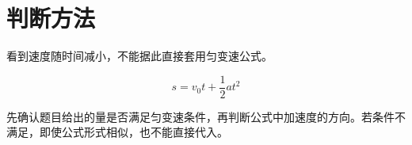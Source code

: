 \section{判断方法}

看到速度随时间减小，不能据此直接套用匀变速公式。

\begin{equation}
  s=v_0t+\frac{1}{2}at^2
\end{equation}

先确认题目给出的量是否满足匀变速条件，再判断公式中加速度的方向。若条件不满足，即使公式形式相似，也不能直接代入。
